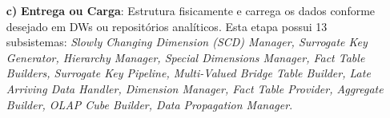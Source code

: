 \begin{itemize}
	\item[\textbf{c)}] \textbf{Entrega ou Carga}: Estrutura fisicamente e carrega os dados conforme desejado em DWs ou repositórios analíticos. Esta etapa possui 13 subsistemas: \textit{Slowly Changing Dimension (SCD) Manager, Surrogate Key Generator, Hierarchy Manager, Special Dimensions Manager, Fact Table Builders, Surrogate Key Pipeline, Multi-Valued Bridge Table Builder, Late Arriving Data Handler, Dimension Manager, Fact Table Provider, Aggregate Builder, OLAP Cube Builder, Data Propagation Manager}.

\end{itemize}
